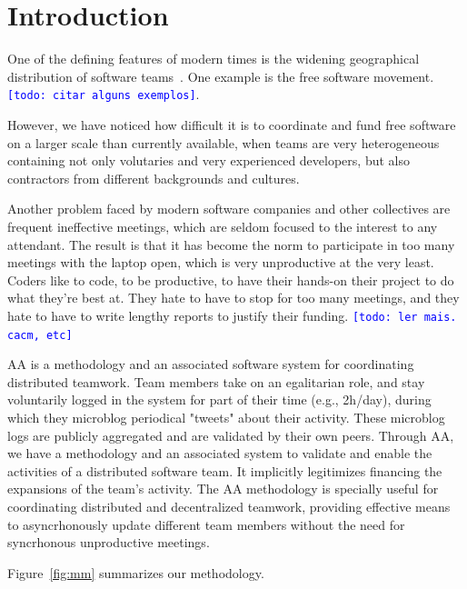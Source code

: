 \documentclass[letterpaper]{article}
\newcommand{\indraftnote}[1]{\textcolor{blue}{\texttt{\footnotesize[#1]}}}
\newcommand{\todo}[1]{\indraftnote{todo: #1}}
\begin{document}


\section{Introduction}

One of the defining features of modern times is the widening geographical
distribution of software teams~\cite{}. One example is the free software
movement. \todo{citar alguns exemplos}.

However, we have noticed how difficult it is to coordinate and fund free
software on a larger scale than currently available, when teams are very
heterogeneous containing not only volutaries and very experienced developers,
but also contractors from different backgrounds and cultures.

Another problem faced by modern software companies and other collectives are frequent
ineffective meetings, which are seldom focused to the interest to any
attendant. The result is that it has become the norm to participate in too many
meetings with the laptop open, which is very unproductive at the very least.
Coders like to code, to be productive, to have their hands-on their project to
do what they're best at. They hate to have to stop for too many meetings,
and they hate to have to write lengthy reports to justify their funding.
\todo{ler mais. cacm, etc}

AA is a methodology and an associated software system for coordinating
distributed teamwork.  Team members take on an egalitarian role, and stay
voluntarily logged in the system for part of their time (e.g., 2h/day), during
which they microblog periodical "tweets" about their activity. These microblog
logs are publicly aggregated and are validated by their own peers. Through AA,
we have a methodology and an associated system to validate and enable the
activities of a distributed software team. It implicitly legitimizes financing
the expansions of the team's activity. The AA methodology is specially useful
for coordinating distributed and decentralized teamwork, providing effective
means to asyncrhonously update different team members without the need for
syncrhonous unproductive meetings.

Figure~\ref{fig:mm} summarizes our methodology.
\end{document}
